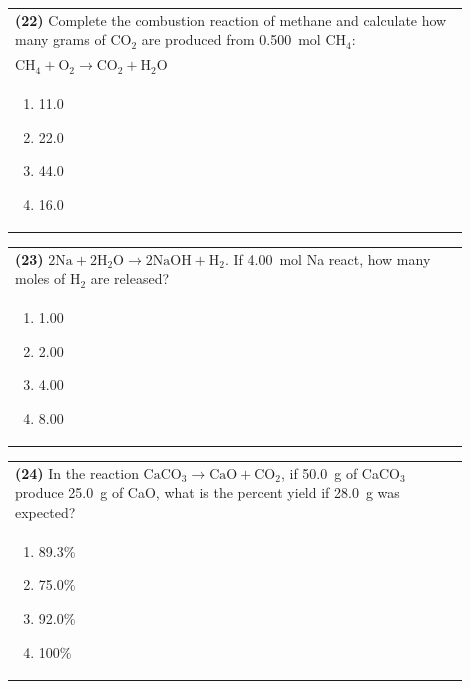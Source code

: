 \documentclass{article}
\begin{document}
{{\vspace{0.2cm}
\noindent\begin{tabular}{|p{0.9\linewidth}|}
\hline
\textbf{(22)} Complete the combustion reaction of methane and calculate how many grams of CO$_2$ are produced from 0.500~mol CH$_4$: \\[0.2cm]
\hspace{1em} $\text{CH}_4 + \text{O}_2 \rightarrow \text{CO}_2 + \text{H}_2\text{O}$ \\[0.2cm]

\begin{minipage}[t]{0.85\linewidth}
\begin{enumerate}[label=\alph*.]
\item 11.0
\item 22.0
\item 44.0
\item 16.0
\end{enumerate}
\end{minipage}\\[0.2cm]
\hline
\end{tabular}

\vspace{0.2cm}
\noindent\begin{tabular}{|p{0.9\linewidth}|}
\hline
\textbf{(23)} $2\text{Na} + 2\text{H}_2\text{O} \rightarrow 2\text{NaOH} + \text{H}_2$. If 4.00~mol Na react, how many moles of H$_2$ are released?\\[0.2cm]

\begin{minipage}[t]{0.85\linewidth}
\begin{enumerate}[label=\alph*.]
\item 1.00
\item 2.00
\item 4.00
\item 8.00
\end{enumerate}
\end{minipage}\\[0.2cm]
\hline
\end{tabular}

\vspace{0.2cm}
\noindent\begin{tabular}{|p{0.9\linewidth}|}
\hline
\textbf{(24)} In the reaction $\text{CaCO}_3 \rightarrow \text{CaO} + \text{CO}_2$, if 50.0~g of CaCO$_3$ produce 25.0~g of CaO, what is the percent yield if 28.0~g was expected?\\[0.2cm]

\begin{minipage}[t]{0.85\linewidth}
\begin{enumerate}[label=\alph*.]
\item 89.3\%
\item 75.0\%
\item 92.0\%
\item 100\%
\end{enumerate}
\end{minipage}\\[0.2cm]
\hline
\end{tabular}

}}
\end{document}
